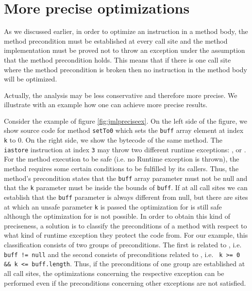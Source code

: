 \section{More precise optimizations}

\label{section:optimprecise}

As we discussed earlier, in order to optimize an instruction in a method body, the method precondition must be established at every call site and the method implementation must be proved not to throw an exception under the assumption that the method precondition holds. This means that if there is one call site where the method precondition is broken then no instruction in the method body will be optimized.

Actually, the analysis may be less conservative and therefore more precise. We illustrate with an example how
one can achieve more precise results.

Consider the example of figure \ref{fig:jmlpreciseex}. On the left side of the figure, we show source code for method \verb!setTo0! which sets the \verb!buff! array element at index \verb!k! to 0. On the right side, we show the bytecode of the same method. The \texttt{iastore} instruction at index \texttt{3} may throw two different runtime exceptions: \NullPointerExc, or \ArrIndexOutOfBoundExc. For the method execution to be safe (i.e. no Runtime exception is thrown), the method requires some certain conditions to be fulfilled by its callers. Thus, the method's precondition states that the \verb!buff! array parameter must not be null and that the \verb!k! parameter must be inside the bounds of \verb!buff!. If at all call sites we can establish that the \verb!buff! parameter is always different from null, but there are sites at which an unsafe parameter \verb!k! is passed the optimization for \NullPointerExc is still safe although the optimization for \ArrIndexOutOfBoundExc is not possible. In order to obtain this kind of preciseness, a solution is to classify the preconditions of a method with respect to what kind of runtime exception they protect the code from. For our example, this classification consists of two groups of preconditions. The first is related to \NullPointerExc, i.e. \texttt{buff != null} and the second consists of preconditions related to \ArrIndexOutOfBoundExc, i.e. \verb! k >= 0 && k <= buff.length!. Thus, if the preconditions of one group are established at all call sites, the optimizations concerning the respective exception can be performed even if the preconditions concerning other exceptions are not satisfied.

